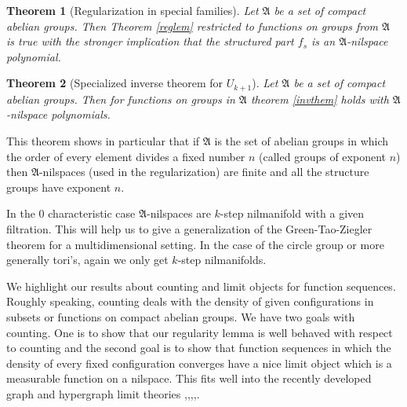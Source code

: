 \documentclass [11pt] {article}
\newtheorem{theorem}{Theorem}
\begin{document}
\begin{theorem}[Regularization in special families]\label{restreg} Let $\mathfrak{A}$ be a set of compact abelian groups. Then Theorem \ref{reglem} restricted to functions on groups from $\mathfrak{A}$ is true with the stronger implication that the structured part $f_s$ is an $\mathfrak{A}$-nilspace polynomial.
\end{theorem} 

\begin{theorem}[Specialized inverse theorem for $U_{k+1}$]\label{restinv} Let $\mathfrak{A}$ be a set of compact abelian groups. Then for functions on groups in $\mathfrak{A}$ theorem \ref{invthem} holds with $\mathfrak{A}$-nilspace polynomials.
\end{theorem}

This theorem shows in particular that if $\mathfrak{A}$ is the set of abelian groups in which the order of every element divides a fixed number $n$ (called groups of exponent $n$) then $\mathfrak{A}$-nilspaces (used in the regularization) are finite and all the structure groups have exponent $n$. 

In the $0$ characteristic case $\mathfrak{A}$-nilspaces are $k$-step nilmanifold with a given filtration. This will help us to give a generalization of the Green-Tao-Ziegler theorem \cite{GTZ} for a multidimensional setting.
In the case of the circle group or more generally tori's, again we only get $k$-step nilmanifolds.

\bigskip
We highlight our results about counting and limit objects for function sequences.
Roughly speaking, counting deals with the density of given configurations in subsets or functions on compact abelian groups. We have two goals with counting. One is to show that our regularity lemma is well behaved with respect to counting and the second goal is
to show that function sequences in which the density of every fixed configuration converges have a nice limit object which is a measurable function on a nilspace. This fits well into the recently developed graph and hypergraph limit theories \cite{LSz1},\cite{BCLSV1},\cite{LSz3},\cite{LSz4},\cite{ESz}.
 
\end{document}
